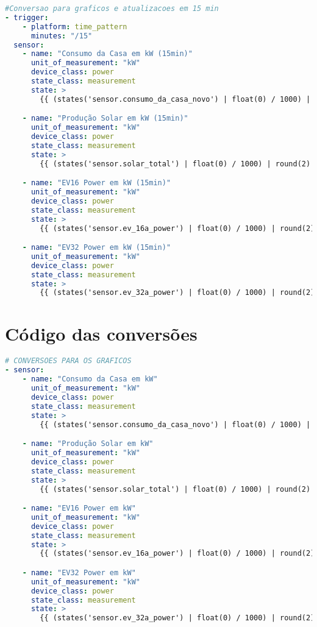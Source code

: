 \lstset{inputencoding=ascii}
\begin{lstlisting}[language=YAML, caption={conversion\_grafic\_15min.yaml}]
#Conversao para graficos e atualizacoes em 15 min
- trigger:
    - platform: time_pattern
      minutes: "/15"
  sensor:
    - name: "Consumo da Casa em kW (15min)"
      unit_of_measurement: "kW"
      device_class: power
      state_class: measurement
      state: >
        {{ (states('sensor.consumo_da_casa_novo') | float(0) / 1000) | round(2) }}

    - name: "Produção Solar em kW (15min)"
      unit_of_measurement: "kW"
      device_class: power
      state_class: measurement
      state: >
        {{ (states('sensor.solar_total') | float(0) / 1000) | round(2) }}

    - name: "EV16 Power em kW (15min)"
      unit_of_measurement: "kW"
      device_class: power
      state_class: measurement
      state: >
        {{ (states('sensor.ev_16a_power') | float(0) / 1000) | round(2) }}

    - name: "EV32 Power em kW (15min)"
      unit_of_measurement: "kW"
      device_class: power
      state_class: measurement
      state: >
        {{ (states('sensor.ev_32a_power') | float(0) / 1000) | round(2) }}


\end{lstlisting}

\section{Código das conversões}

\lstset{inputencoding=ascii}
\begin{lstlisting}[language=YAML, caption={conversions.yaml}]
 # CONVERSOES PARA OS GRAFICOS
- sensor:
    - name: "Consumo da Casa em kW"
      unit_of_measurement: "kW"
      device_class: power
      state_class: measurement
      state: >
        {{ (states('sensor.consumo_da_casa_novo') | float(0) / 1000) | round(2) }}

    - name: "Produção Solar em kW"
      unit_of_measurement: "kW"
      device_class: power
      state_class: measurement
      state: >
        {{ (states('sensor.solar_total') | float(0) / 1000) | round(2) }}

    - name: "EV16 Power em kW"
      unit_of_measurement: "kW"
      device_class: power
      state_class: measurement
      state: >
        {{ (states('sensor.ev_16a_power') | float(0) / 1000) | round(2) }}

    - name: "EV32 Power em kW"
      unit_of_measurement: "kW"
      device_class: power
      state_class: measurement
      state: >
        {{ (states('sensor.ev_32a_power') | float(0) / 1000) | round(2) }}


\end{lstlisting}

